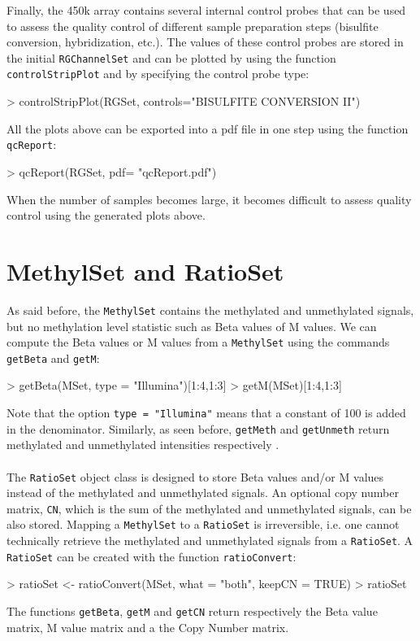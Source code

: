 \documentclass[12pt]{article}
\newcommand{\Rcode}[1]{{\texttt{#1}}}
\begin{document}
Finally, the 450k array contains several internal control probes that can be used to assess the quality control of different sample preparation steps (bisulfite conversion, hybridization, etc.). The values of these control probes are stored in the initial \Rcode{RGChannelSet} and can be plotted by using the function \Rcode{controlStripPlot} and by specifying the control probe type:
\begin{Schunk}
\begin{Sinput}
> controlStripPlot(RGSet, controls="BISULFITE CONVERSION II")
\end{Sinput}
\end{Schunk}
All the plots above can be exported into a pdf file in one step using the function \texttt{qcReport}:
\begin{Schunk}
\begin{Sinput}
> qcReport(RGSet, pdf= "qcReport.pdf")
\end{Sinput}
\end{Schunk}
When the number of samples becomes large, it becomes difficult to assess quality control using the generated plots above.


\section{MethylSet and RatioSet}
As said before, the \Rcode{MethylSet} contains the methylated and unmethylated signals, but no methylation level statistic such as Beta values of M values. We can compute the Beta values or M values from a \Rcode{MethylSet} using  the commands \Rcode{getBeta} and \Rcode{getM}:
\begin{Schunk}
\begin{Sinput}
> getBeta(MSet, type = "Illumina")[1:4,1:3]
> getM(MSet)[1:4,1:3]
\end{Sinput}
\end{Schunk}
Note that the option \texttt{type = "Illumina"} means that a constant of 100 is added in the denominator. Similarly, as seen before, \texttt{getMeth} and \texttt{getUnmeth} return methylated and unmethylated intensities respectively . 
\\
\\
The \Rcode{RatioSet} object class is designed to store Beta values and/or M values instead of the methylated and unmethylated signals. An optional copy number matrix, \Rcode{CN}, which is the sum of the methylated and unmethylated signals, can be also stored. Mapping a \Rcode{MethylSet} to a \Rcode{RatioSet} is irreversible, i.e. one cannot technically retrieve the methylated and unmethylated signals from a \Rcode{RatioSet}.  A \Rcode{RatioSet} can be created with the function \Rcode{ratioConvert}:
\begin{Schunk}
\begin{Sinput}
> ratioSet <- ratioConvert(MSet, what = "both", keepCN = TRUE)
> ratioSet
\end{Sinput}
\end{Schunk}
The functions \Rcode{getBeta}, \Rcode{getM} and \Rcode{getCN} return respectively the Beta value matrix, M value matrix and a the Copy Number matrix. 
\end{document}

